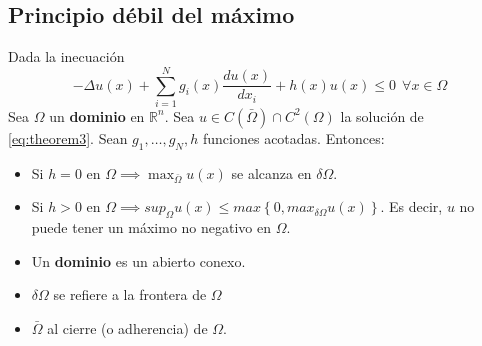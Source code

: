 \subsection{Principio débil del máximo}
\begin{theorem}\label{theorem3}
Dada la inecuación
\begin{equation}\label{eq:theorem3}
-\Delta u(x) + \sum_{i=1}^N g_i(x)\frac{du(x)}{dx_i}+h(x)u(x) \le 0 \ \ \forall x\in\Omega
\end{equation}
Sea $\Omega$ un \textbf{dominio} en $\mathbb{R}^n$.
Sea $u\in C(\bar{\Omega})\cap C^2(\Omega)$ la solución de \eqref{eq:theorem3}.
Sean $g_1,\hdots, g_N,h$ funciones acotadas.
Entonces:
\begin{itemize}
\item Si $h=0$ en $\Omega \implies \max_{\bar{\Omega}} u(x)$ se alcanza en $\delta\Omega$. 
\item Si $h>0$ en $\Omega \implies sup_{\Omega} u(x) \le max\left\{0, max_{\delta\Omega} u(x)\right\}$. Es decir, $u$ no puede tener un máximo no negativo en $\Omega$.
\end{itemize}
\end{theorem}
\see
\begin{itemize}
\item Un \textbf{dominio} es un abierto conexo.
\item $\delta\Omega$ se refiere a la frontera de $\Omega$ 
\item $\bar{\Omega}$ al cierre (o adherencia) de $\Omega$.
\end{itemize}

